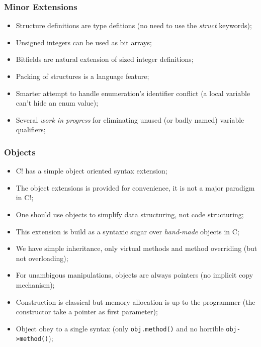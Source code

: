 \documentclass[pdftex]{beamer}
\begin{document}
\begin{frame}[fragile]
  \frametitle{Minor Extensions}
  \begin{itemize}
  \item Structure definitions are type defitions (no need to use the
    \emph{struct} keywords);
  \item Unsigned integers can be used as bit arrays;
  \item Bitfields are natural extension of sized integer definitions;
  \item Packing of structures is a language feature;
  \item Smarter attempt to handle enumeration's identifier conflict (a
    local variable can't hide an enum value);
  \item Several \emph{work in progress} for eliminating unused (or
    badly named) variable qualifiers;
  \end{itemize}
\end{frame}

\begin{frame}[fragile]
  \frametitle{Objects}
  \begin{itemize}
  \item C! has a simple object oriented syntax extension;
  \item The object extensions is provided for convenience, it is not a
    major paradigm in C!;
  \item One should use objects to simplify data structuring, not code
    structuring;
  \item This extension is build as a syntaxic sugar over
    \emph{hand-made} objects in C;
  \item We have simple inheritance, only virtual methods and method
    overriding (but not overloading);
  \item For unambigous manipulations, objects are always pointers (no
    implicit copy mechanism);
  \item Construction is classical but memory allocation is up to the
    programmer (the constructor take a pointer as first parameter);
  \item Object obey to a single syntax (only \verb|obj.method()| and
    no horrible \verb|obj->method()|);
  \end{itemize}
\end{frame}
\end{document}

